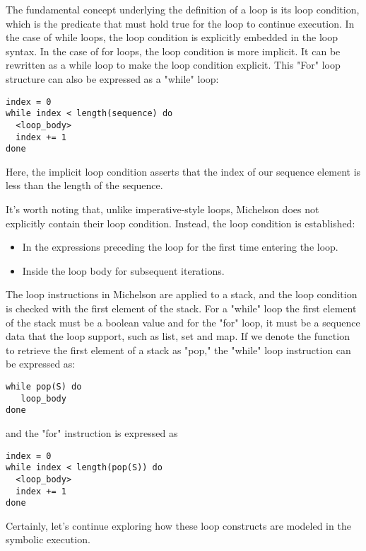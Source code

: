 \documentclass[a4paper,UKenglish,cleveref, autoref, thm-restate]{lipics-v2021}
\begin{document}
The fundamental concept underlying the definition of a loop is its loop condition, which is the predicate that must hold true for the loop to continue execution. In the case of while loops, the  loop condition is explicitly embedded in the loop syntax. In the case of for loops, the loop condition is more implicit. It can be rewritten as a while loop to make the  loop condition explicit. This "For" loop structure can also be expressed as a "while" loop:
\begin{verbatim}
index = 0
while index < length(sequence) do
  <loop_body>
  index += 1
done
\end{verbatim}
Here, the implicit loop condition asserts that the index of our sequence element is less than the length of the sequence.

It's worth noting that, unlike imperative-style loops, Michelson does not explicitly contain their  loop condition. Instead, the  loop condition is established:
\begin{itemize}
 \item In the expressions preceding the loop for the first time entering the loop.
 \item Inside the loop body for subsequent iterations.
\end{itemize}

The loop instructions in Michelson are applied to a stack, and the loop condition is checked with the first element of the stack. For a "while" loop the first element of the stack must be a boolean value and for the "for" loop, it must be a sequence data that the loop support, such as list, set and map. If we denote the function to retrieve the first element of a stack as "pop," the "while" loop instruction can be expressed as:
\begin{verbatim}
while pop(S) do
   loop_body
done
\end{verbatim}
and the "for" instruction is expressed as
\begin{verbatim}
index = 0
while index < length(pop(S)) do
  <loop_body>
  index += 1
done
\end{verbatim}

Certainly, let's continue exploring how these loop constructs are modeled in the symbolic execution. 
\end{document}
